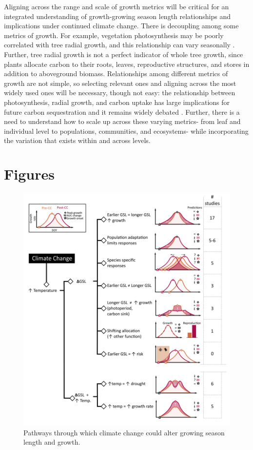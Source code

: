\documentclass[11pt]{article}
\begin{document}
Aligning across the range and scale of growth metrics will be critical for an integrated understanding of growth-growing season length relationships and implications under continued climate change. There is decoupling among some metrics of growth. For example, vegetation photosynthesis may be poorly correlated with tree radial growth, and this relationship can vary seasonally \citep{cabon2022cross}. Further, tree radial growth is not a perfect indicator of whole tree growth, since plants allocate carbon to their roots, leaves, reproductive structures, and stores in addition to aboveground biomass. Relationships among different metrics of growth are not simple, so selecting relevant ones and aligning across the most widely used ones will be necessary, though not easy: the relationship  between photosynthesis, radial growth, and carbon uptake has large implications for future carbon sequestration and it remains widely debated \citep{green2022limits}. Further, there is a need to understand how to scale up across these varying metrics- from leaf and individual level to populations, communities, and ecosystems- while incorporating the variation that exists within and across levels.


\newpage
\section{Figures}


\clearpage
\begin{figure}[h!]
\includegraphics[width=1\textwidth]{..//figures/hypothesesconceptfig.png}
\caption{Pathways through which climate change could alter growing season length and growth.}
\label{fig:hypotheses}
\end{figure}
\end{document}
